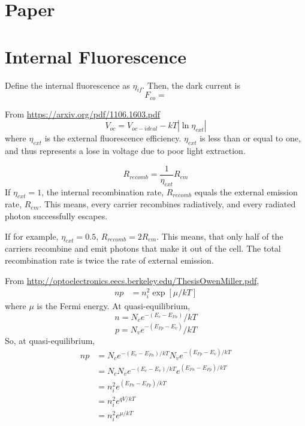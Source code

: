 \documentclass[12pt]{article}
\date{\today }
\author{
Paul W. Leu\\
University of Pittsburgh\\
Pittsburgh, PA}
\numberwithin{equation}{section}
\begin{document}
\tableofcontents

\section{Paper}

\section{Internal Fluorescence}
Define the internal fluorescence as $\eta_{if}$.  
Then, the dark current is 
\begin{equation}
F_{co} = 
\end{equation}


From \url{https://arxiv.org/pdf/1106.1603.pdf}
\begin{equation}
V_{oc} = V_{oc-ideal} - k T | \ln \eta_{ext} |
\end{equation}
where $\eta_{ext}$ is the external fluorescence efficiency.  
$\eta_{ext}$ is less than or equal to one, and thus represents a lose in 
voltage due to poor light extraction.  

\begin{equation}
R_{recomb} = \frac{1}{\eta_{ext}} R_{em}
\end{equation}
If $\eta_{ext} = 1$, the internal recombination rate, $R_{recomb}$ equals the external emission rate, 
$R_{em}$.  This means, every carrier recombines radiatively, and every radiated photon successfully escapes.  

If for example, $\eta_{ext} = 0.5$, $R_{recomb} = 2 R_{em}$.  This means, that only half of the 
carriers recombine and emit photons that make it out of the cell.  The total recombination rate is twice the rate of external emission.  


From \url{http://optoelectronics.eecs.berkeley.edu/ThesisOwenMiller.pdf},
\begin{align}
n p &= n_i^2 \exp \left [ \mu/ k T \right ]
\end{align}
where $\mu$ is the Fermi energy.  
At quasi-equilibrium, 
\begin{equation}
n = N_c e^{-(E_c - E_{Fn})}/k T
\end{equation}
\begin{equation}
p = N_v e^{-(E_{Fp} - E_{v})}/k T
\end{equation}
So, at quasi-equilibrium, 
\begin{align}
n p &= N_c e^{-( E_c - E_{Fn}) /k T } N_v e^{- (E_{Fp} - E_{v})/k T} \\
&= N_c N_v e^{-(E_c - E_v)/ k T} e^{(E_{Fn} - E_{Fp})/ k T} \\
&= n_i^2 e^{(E_{Fn} - E_{Fp})/ k T} \\
&= n_i^2 e^{q V/ k T} \\
&= n_i^2 e^{\mu/ k T} \\
\end{align}
\end{document}
